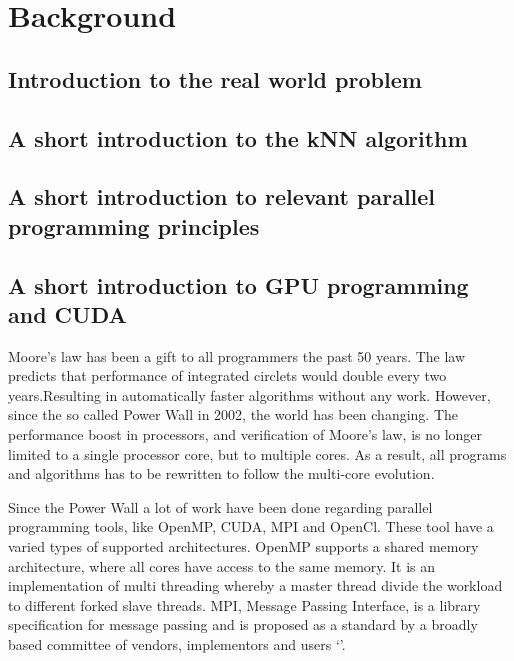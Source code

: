 \section{Background}

\subsection{Introduction to the real world problem} %
\label{sub:introduction_to_the_real_world_problem}


\subsection{A short introduction to the kNN algorithm} %
\label{a_short_introduction_to_the_kNN_algorithm}


\subsection{A short introduction to relevant parallel programming principles} %
\label{sub:a_short_introduction_to_relevant_parallel_programming_principles}


\subsection{A short introduction to GPU programming and CUDA} %
\label{sub:a_short_introduction_to_gpu_programming_and_cuda}

Moore's law has been a gift to all programmers the past 50 years. The law predicts that performance of integrated circlets would double every two years.Resulting in automatically faster algorithms without any work. However, since the so called Power Wall in 2002, the world has been changing. The performance boost  in processors, and verification of Moore's law, is no longer limited to a single processor core, but to multiple cores. As a result, all programs and algorithms has to be rewritten to follow the multi-core evolution.

Since the Power Wall a lot of work have been done regarding parallel programming tools, like OpenMP, CUDA, MPI and OpenCl. These tool have a varied types of supported architectures. OpenMP supports a shared memory architecture, where all cores have access to the same memory. It is an implementation of multi threading whereby a master thread divide the workload to different forked slave threads. MPI, Message Passing Interface, is a library specification for message passing and is proposed as a standard by a broadly based committee of vendors, implementors and users `'.

